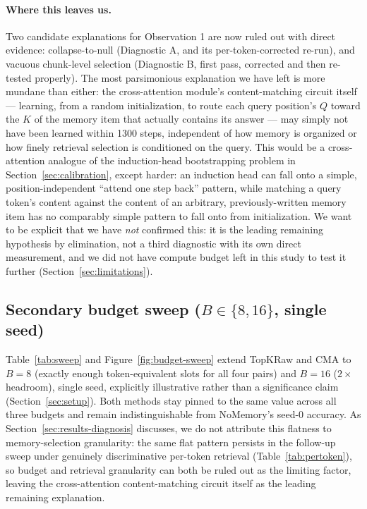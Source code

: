 \documentclass[11pt]{article}
\begin{document}
\paragraph{Where this leaves us.} Two candidate explanations for Observation 1 are now ruled out
with direct evidence: collapse-to-null (Diagnostic A, and its per-token-corrected re-run), and
vacuous chunk-level selection (Diagnostic B, first pass, corrected and then re-tested properly).
The most parsimonious explanation we have left is more mundane than either: the cross-attention
module's content-matching circuit itself --- learning, from a random initialization, to route each
query position's $Q$ toward the $K$ of the memory item that actually contains its answer --- may
simply not have been learned within 1300 steps, independent of how memory is organized or how
finely retrieval selection is conditioned on the query. This would be a cross-attention analogue of
the induction-head bootstrapping problem in Section~\ref{sec:calibration}, except harder: an
induction head can fall onto a simple, position-independent ``attend one step back'' pattern, while
matching a query token's content against the content of an arbitrary, previously-written memory
item has no comparably simple pattern to fall onto from initialization. We want to be explicit that
we have \emph{not} confirmed this: it is the leading remaining hypothesis by elimination, not a
third diagnostic with its own direct measurement, and we did not have compute budget left in this
study to test it further (Section~\ref{sec:limitations}).

\subsection{Secondary budget sweep ($B \in \{8, 16\}$, single seed)}
\label{sec:results-sweep}

Table~\ref{tab:sweep} and Figure~\ref{fig:budget-sweep} extend TopKRaw and CMA to $B{=}8$ (exactly
enough token-equivalent slots for all four pairs) and $B{=}16$ ($2\times$ headroom), single seed,
explicitly illustrative rather than a significance claim (Section~\ref{sec:setup}). Both methods
stay pinned to the same value across all three budgets and remain indistinguishable from
NoMemory's seed-0 accuracy. As Section~\ref{sec:results-diagnosis} discusses, we do not attribute
this flatness to memory-selection granularity: the same flat pattern persists in the follow-up
sweep under genuinely discriminative per-token retrieval (Table~\ref{tab:pertoken}), so budget and
retrieval granularity can both be ruled out as the limiting factor, leaving the cross-attention
content-matching circuit itself as the leading remaining explanation.
\end{document}
